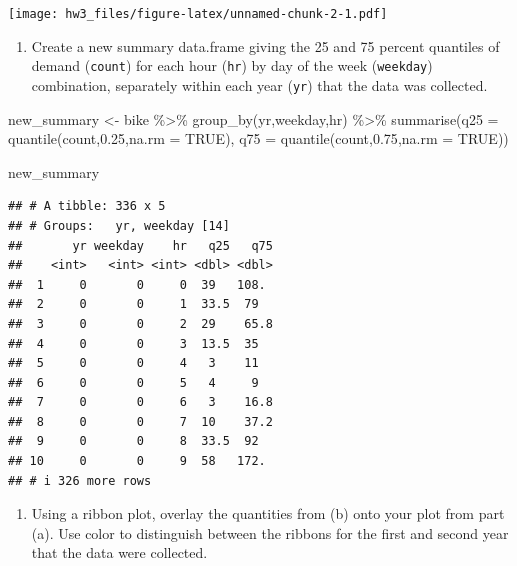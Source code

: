 \documentclass[
]{article}
\newenvironment{Shaded}{\begin{snugshade}}{\end{snugshade}}
\newcommand{\AttributeTok}[1]{\textcolor[rgb]{0.77,0.63,0.00}{#1}}
\newcommand{\ConstantTok}[1]{\textcolor[rgb]{0.00,0.00,0.00}{#1}}
\newcommand{\FloatTok}[1]{\textcolor[rgb]{0.00,0.00,0.81}{#1}}
\newcommand{\FunctionTok}[1]{\textcolor[rgb]{0.00,0.00,0.00}{#1}}
\newcommand{\NormalTok}[1]{#1}
\newcommand{\OtherTok}[1]{\textcolor[rgb]{0.56,0.35,0.01}{#1}}
\newcommand{\SpecialCharTok}[1]{\textcolor[rgb]{0.00,0.00,0.00}{#1}}
\providecommand{\tightlist}{%
  \setlength{\itemsep}{0pt}\setlength{\parskip}{0pt}}
\begin{document}
\texttt{[image: hw3\_files/figure-latex/unnamed-chunk-2-1.pdf]}

\begin{enumerate}
\def\labelenumi{\alph{enumi}.}
\setcounter{enumi}{1}
\tightlist
\item
  Create a new summary data.frame giving the 25 and 75 percent quantiles
  of demand (\texttt{count}) for each hour (\texttt{hr}) by day of the
  week (\texttt{weekday}) combination, separately within each year
  (\texttt{yr}) that the data was collected.
\end{enumerate}

\begin{Shaded}
\begin{Highlighting}[]
\NormalTok{new\_summary }\OtherTok{\textless{}{-}}\NormalTok{ bike }\SpecialCharTok{\%\textgreater{}\%}
  \FunctionTok{group\_by}\NormalTok{(yr,weekday,hr) }\SpecialCharTok{\%\textgreater{}\%}
  \FunctionTok{summarise}\NormalTok{(}\AttributeTok{q25 =} \FunctionTok{quantile}\NormalTok{(count,}\FloatTok{0.25}\NormalTok{,}\AttributeTok{na.rm =} \ConstantTok{TRUE}\NormalTok{),}
            \AttributeTok{q75 =} \FunctionTok{quantile}\NormalTok{(count,}\FloatTok{0.75}\NormalTok{,}\AttributeTok{na.rm =} \ConstantTok{TRUE}\NormalTok{))}

\NormalTok{new\_summary}
\end{Highlighting}
\end{Shaded}

\begin{verbatim}
## # A tibble: 336 x 5
## # Groups:   yr, weekday [14]
##       yr weekday    hr   q25   q75
##    <int>   <int> <int> <dbl> <dbl>
##  1     0       0     0  39   108. 
##  2     0       0     1  33.5  79  
##  3     0       0     2  29    65.8
##  4     0       0     3  13.5  35  
##  5     0       0     4   3    11  
##  6     0       0     5   4     9  
##  7     0       0     6   3    16.8
##  8     0       0     7  10    37.2
##  9     0       0     8  33.5  92  
## 10     0       0     9  58   172. 
## # i 326 more rows
\end{verbatim}

\begin{enumerate}
\def\labelenumi{\alph{enumi}.}
\setcounter{enumi}{2}
\tightlist
\item
  Using a ribbon plot, overlay the quantities from (b) onto your plot
  from part (a). Use color to distinguish between the ribbons for the
  first and second year that the data were collected.
\end{enumerate}
\end{document}
